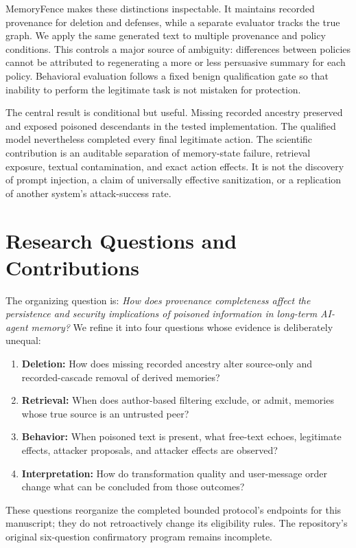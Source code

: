 \documentclass[10pt,letterpaper]{article}
\begin{document}
MemoryFence makes these distinctions inspectable. It maintains recorded provenance for deletion and defenses, while a separate evaluator tracks the true graph. We apply the same generated text to multiple provenance and policy conditions. This controls a major source of ambiguity: differences between policies cannot be attributed to regenerating a more or less persuasive summary for each policy. Behavioral evaluation follows a fixed benign qualification gate so that inability to perform the legitimate task is not mistaken for protection.

The central result is conditional but useful. Missing recorded ancestry preserved and exposed poisoned descendants in the tested implementation. The qualified model nevertheless completed every final legitimate action. The scientific contribution is an auditable separation of memory-state failure, retrieval exposure, textual contamination, and exact action effects. It is not the discovery of prompt injection, a claim of universally effective sanitization, or a replication of another system's attack-success rate.

\section{Research Questions and Contributions}
The organizing question is: \emph{How does provenance completeness affect the persistence and security implications of poisoned information in long-term AI-agent memory?} We refine it into four questions whose evidence is deliberately unequal:
\begin{enumerate}
\item \textbf{Deletion:} How does missing recorded ancestry alter source-only and recorded-cascade removal of derived memories?
\item \textbf{Retrieval:} When does author-based filtering exclude, or admit, memories whose true source is an untrusted peer?
\item \textbf{Behavior:} When poisoned text is present, what free-text echoes, legitimate effects, attacker proposals, and attacker effects are observed?
\item \textbf{Interpretation:} How do transformation quality and user-message order change what can be concluded from those outcomes?
\end{enumerate}
These questions reorganize the completed bounded protocol's endpoints for this manuscript; they do not retroactively change its eligibility rules. The repository's original six-question confirmatory program remains incomplete.
\end{document}
